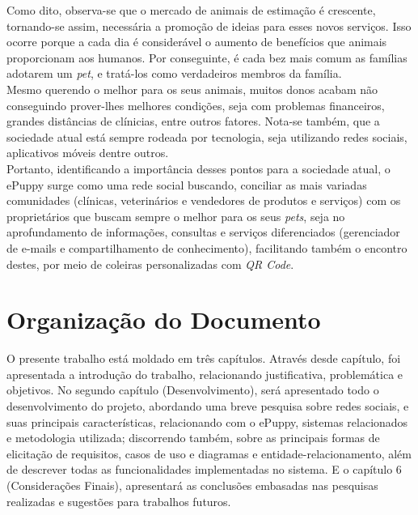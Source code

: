 Como dito, observa-se que o mercado de animais de estimação é crescente, tornando-se assim, necessária a promoção de ideias para esses novos serviços. Isso ocorre porque a cada dia é considerável o aumento de benefícios que animais proporcionam aos humanos. Por conseguinte, é cada bez mais comum as famílias adotarem um {\it pet}, e tratá-los como verdadeiros membros da família.
\\
\indent
Mesmo querendo o melhor para os seus animais, 
muitos donos acabam não conseguindo prover-lhes melhores condições, seja com problemas financeiros, grandes distâncias de clínicias, entre outros fatores. Nota-se também, que a sociedade atual está sempre rodeada por tecnologia, seja utilizando redes sociais, aplicativos móveis dentre outros.
\\
\indent
Portanto, identificando a importância desses pontos para a sociedade atual, o ePuppy surge como uma rede social buscando, conciliar as mais variadas comunidades (clínicas, veterinários e vendedores de produtos e serviços) com os proprietários que buscam sempre o melhor para os seus {\it pets}, seja no aprofundamento de informações, consultas e serviços diferenciados (gerenciador de e-mails e compartilhamento de conhecimento), facilitando também o encontro destes, por meio de coleiras personalizadas com {\it QR Code}.


\section{Organização do Documento}

O presente trabalho está moldado em três capítulos. Através desde capítulo, foi apresentada a introdução do trabalho, relacionando justificativa, problemática e objetivos. No segundo capítulo (Desenvolvimento), será apresentado todo o desenvolvimento do projeto, abordando uma breve pesquisa sobre redes sociais, e suas principais características, relacionando com o ePuppy, sistemas relacionados e metodologia utilizada;  discorrendo também, sobre as principais formas de elicitação de requisitos, casos de uso e diagramas e entidade-relacionamento, além de descrever todas as funcionalidades implementadas no sistema. E o capítulo 6 (Considerações Finais), apresentará as conclusões embasadas nas pesquisas realizadas e sugestões para trabalhos futuros.

\nocite{Nascimento2014}
\nocite{Aguilar2015}
\nocite{Anaya2015}
\nocite{Arias2015}
\nocite{G12015}
\nocite{Gazzana2015}
\nocite{Veja2015}
